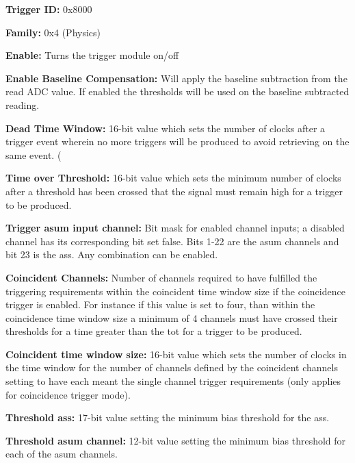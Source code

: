 \begin{description}
\item \textbf{Trigger ID: } 0x8000

\item \textbf{Family: } 0x4 (Physics)

\item \textbf{Enable: }Turns the trigger module on/off

\item \textbf{Enable Baseline Compensation: }Will apply the baseline subtraction from the read ADC value. If enabled the thresholds will be used on the baseline subtracted reading.

\item \textbf{Dead Time Window: } 16-bit value which sets the number of clocks after a trigger event wherein no more triggers will be produced to avoid retrieving on the same event. (

\item \textbf{Time over Threshold: }16-bit value which sets the minimum number of clocks after a threshold has been crossed that the signal must remain high for a trigger to be produced. 
 
\item \textbf{Trigger \gls{asum} input channel: } Bit mask for enabled channel inputs; a disabled channel has its corresponding bit set false. Bits 1-22 are the \gls{asum} channels and bit 23 is the \gls{ass}. Any combination can be enabled. 

\item \textbf{Coincident Channels: }Number of channels required to have fulfilled the triggering requirements within the coincident time window size if the coincidence trigger is enabled. For instance if this value is set to four, than within the coincidence time window size a minimum of 4 channels must have crossed their thresholds for a time greater than the \gls{tot} for a trigger to be produced.
	
\item \textbf{Coincident time window size: } 16-bit value which sets the number of clocks in the time window for the number of channels defined by the coincident channels setting to have each meant the single channel trigger requirements (only applies for coincidence trigger mode). 

\item \textbf{Threshold \gls{ass}: }17-bit value setting the minimum bias threshold for the \gls{ass}.

\item \textbf{Threshold \gls{asum} channel: }12-bit value setting the minimum bias threshold for each of the \gls{asum} channels.
\end{description}


